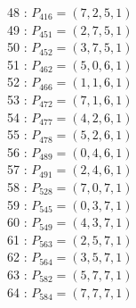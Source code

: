 \documentclass{article}
\begin{document}
{\begin{multicols}{3}
48 : $P_{416}=( 7, 2, 5, 1 )$\\
49 : $P_{451}=( 2, 7, 5, 1 )$\\
50 : $P_{452}=( 3, 7, 5, 1 )$\\
51 : $P_{462}=( 5, 0, 6, 1 )$\\
52 : $P_{466}=( 1, 1, 6, 1 )$\\
53 : $P_{472}=( 7, 1, 6, 1 )$\\
54 : $P_{477}=( 4, 2, 6, 1 )$\\
55 : $P_{478}=( 5, 2, 6, 1 )$\\
56 : $P_{489}=( 0, 4, 6, 1 )$\\
57 : $P_{491}=( 2, 4, 6, 1 )$\\
58 : $P_{528}=( 7, 0, 7, 1 )$\\
59 : $P_{545}=( 0, 3, 7, 1 )$\\
60 : $P_{549}=( 4, 3, 7, 1 )$\\
61 : $P_{563}=( 2, 5, 7, 1 )$\\
62 : $P_{564}=( 3, 5, 7, 1 )$\\
63 : $P_{582}=( 5, 7, 7, 1 )$\\
64 : $P_{584}=( 7, 7, 7, 1 )$\\
\end{multicols}


%


%


}%
\end{document}
